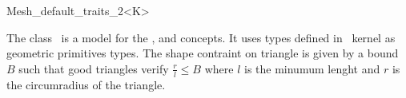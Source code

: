 \begin{ccRefClass}{Mesh_default_traits_2<K>}

\ccDefinition
  
The class \ccRefName\ is a model for the ,
 and 
concepts. It uses types defined in \cgal\ kernel as geometric
primitives types. The shape contraint on triangle is given by a bound
$B$ such that good triangles verify $\frac{r}{l} \le B$ where $l$ is
the minumum lenght and $r$ is the circumradius of the triangle.


\ccIsModel

 \\
 \\

\ccCreation
{}
\end{ccRefClass}
